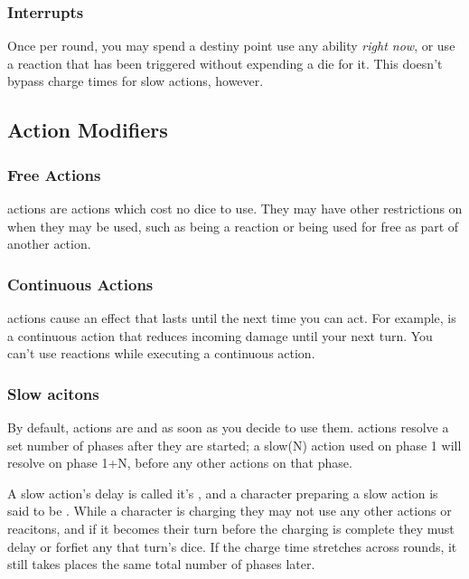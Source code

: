 \begin{multicols}{2}
        \subsubsection{Interrupts}
            Once per round, you may spend a destiny point use any ability \textit{right now}, or use a reaction that has been triggered without expending a die for it. This doesn't bypass charge times for slow actions, however.

    \subsection{Action Modifiers}
        \subsubsection{Free Actions}
             actions are actions which cost no dice to use. They may have other restrictions on when they may be used, such as being a reaction or being used for free as part of another action.

        \subsubsection{Continuous Actions}
             actions cause an effect that lasts until the next time you can act. For example,  is a continuous action that reduces incoming damage until your next turn. You can't use reactions while executing a continuous action.

        \subsubsection{Slow acitons}
            By default, actions are  and  as soon as you decide to use them.  actions resolve a set number of phases after they are started; a slow(N) action used on phase 1 will resolve on phase 1+N, before any other actions on that phase.
            
            A slow action's delay is called it's , and a character preparing a slow action is said to be . While a character is charging they may not use any other actions or reacitons, and if it becomes their turn before the charging is complete they must delay or forfiet any that turn's dice. If the charge time stretches across rounds, it still takes places the same total number of phases later.


\end{multicols}
